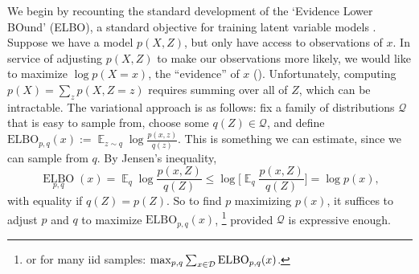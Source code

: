 \documentclass[twoside]{article}
\theoremstyle{plain}
\theoremstyle{definition}
\DeclareMathOperator*{\Ex}{\mathbb{E}} %
\newcommand{\thickD}{I\mkern-8muD}
\newcommand{\kldiv}{\thickD\infdivx}
\begin{document}
We begin by recounting the standard development of the `Evidence Lower BOund' (ELBO), a standard objective for training latent variable models \parencite[\S2.2]{blei2017variational}.
%
Suppose we have a model $p(X,Z)$, but only have access to observations of $x$.
In service of adjusting $p(X,Z)$ to make our observations more likely, we would like to maximize $\log p(X\!\!=\!x)$, the ``evidence'' of $x$ ().
Unfortunately, computing $p(X) = \sum_z p(X,Z\!\!=\!z)$ requires summing over all of $Z$, which can be intractable.
%
The variational approach is as follows: fix a family of distributions $\mathcal Q$ that is easy to sample from, choose some $q(Z) \in \mathcal Q$, and define
$\mathrm{ELBO}_{p,q}(x) := \Ex_{z \sim q} \log \frac{p(x,z)}{q(z)}$.
This is something we can estimate, since we can sample from $q$. By Jensen's inequality,
\[
    \mathop{\mathrm{ELBO}}\limits_{p,q}(x)
    =\! \Ex_{q} \log \frac{p(x,Z)}{q(Z)}
    \le  \log \Big[\! \Ex_{q}\! \frac{p(x,Z)}{q(Z)} \Big]\!
    = \log p(x),
\]
with equality if $q(Z) = p(Z)$.
So to find $p$ maximizing $p(x)$, it suffices to adjust $p$ and $q$ to maximize $\mathrm{ELBO}_{p,q}(x)$,%
    \footnote{or for many iid samples: $\max_{p,q}\sum_{x \in {\mathcal D}}\mathrm{ELBO}_{p,q}(x)$.}
 provided $\mathcal Q$ is expressive enough.
\end{document}
